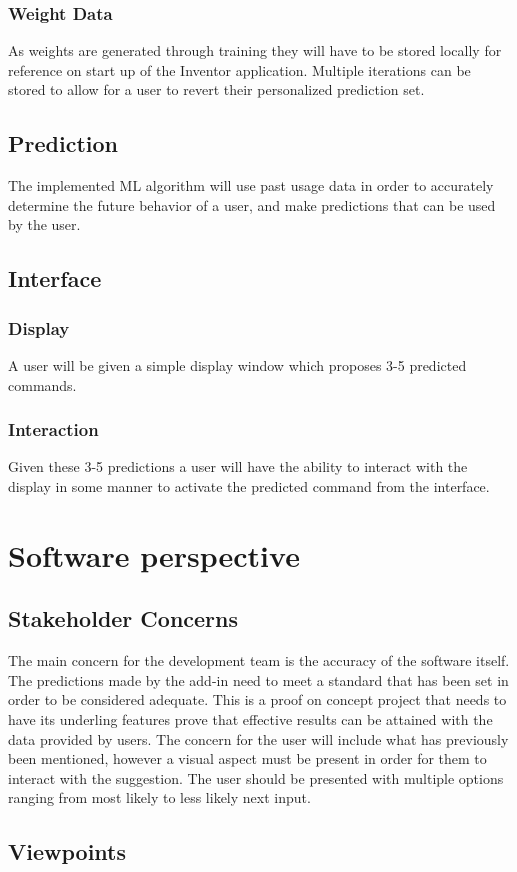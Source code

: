 \documentclass[onecolumn, draftclsnofoot,10pt, compsoc]{IEEEtran}
\begin{document}
\subsubsection{Weight Data}
As weights are generated through training they will have to be stored locally for reference on start up of the Inventor application.  Multiple iterations can be stored to allow for a user to revert their personalized prediction set.
\subsection{Prediction}
The implemented ML algorithm will use past usage data in order to accurately determine the future behavior of a user, and make predictions that can be used by the user.
\subsection{Interface}
\subsubsection{Display}
A user will be given a simple display window which proposes 3-5 predicted commands. 
\subsubsection{Interaction}
Given these 3-5 predictions a user will have the ability to interact with the display in some manner to activate the predicted command from the interface.
\null\newpage
\section{Software perspective}
\subsection{Stakeholder Concerns}
The main concern for the development team is the accuracy of the software itself. The predictions made by the add-in need to meet a standard that has been set in order to be considered adequate. This is a proof on concept project that needs to have its underling features prove that effective results can be attained with the data provided by users. The concern for the user will include what has previously been mentioned, however a visual aspect must be present in order for them to interact with the suggestion. The user should be presented with multiple options ranging from most likely to less likely next input. 
\subsection{Viewpoints}
\end{document}
